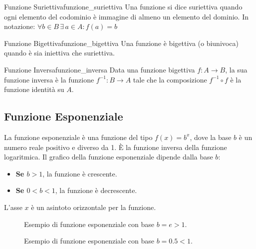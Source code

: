 \documentclass{article}
\begin{document}
\begin{definition}{Funzione Suriettiva}{funzione_suriettiva}
    Una funzione si dice suriettiva quando ogni elemento del codominio è immagine di almeno un elemento del dominio. In notazione: $ \forall b \in B \, \exists \, a \in A: f(a) = b $
\end{definition}

\begin{definition}{Funzione Bigettiva}{funzione_bigettiva}
    Una funzione è bigettiva (o biunivoca) quando è sia iniettiva che suriettiva.
\end{definition}

\begin{definition}{Funzione Inversa}{funzione_inversa}
    Data una funzione bigettiva $f: A \to B$, la sua funzione inversa è la funzione $f^{-1}: B \to A$ tale che la composizione $f^{-1} \circ f$ è la funzione identità su $A$.
\end{definition}

\subsection{Funzione Esponenziale}
La funzione esponenziale è una funzione del tipo $f(x) = b^x$, dove la base $b$ è un numero reale positivo e diverso da 1. È la funzione inversa della funzione logaritmica.
Il grafico della funzione esponenziale dipende dalla base $b$:
\begin{itemize}
    \item \textbf{Se $b > 1$}, la funzione è crescente.
    \item \textbf{Se $0 < b < 1$}, la funzione è decrescente.
\end{itemize}
L'asse $x$ è un asintoto orizzontale per la funzione.

\begin{figure}[!htbp]
\centering
{}
\caption{Esempio di funzione esponenziale con base $b=e > 1$.}
\end{figure}

\begin{figure}[!htbp]
\centering
{}
\caption{Esempio di funzione esponenziale con base $b=0.5 < 1$.}
\end{figure}
\end{document}
